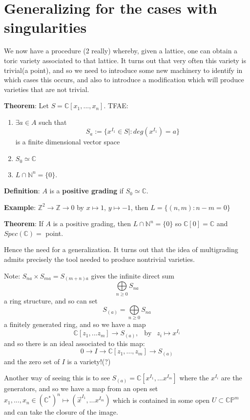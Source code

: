 \documentclass{article}
\newcommand{\C}{\mathbb{C}}
\newcommand{\CP}{\mathbb{C P}}
\newcommand{\N}{\mathbb{N}}
\newcommand{\Z}{\mathbb{Z}}
\begin{document}
	\section{Generalizing for the cases with singularities}
		We now have a procedure (2 really) whereby, given 
		a lattice, one can obtain a toric variety associated 
		to that lattice. It turns out that very often this 
		variety is trivial(a point), and so we need to 
		introduce some new machinery to identify in which 
		cases this occurs, and also to introduce a modification 
		which will produce varieties that are not trivial.


		\noindent\textbf{Theorem}: Let $S=\C[x_1,...,x_n]$. 
		TFAE:
		\begin{enumerate}
		\item $\exists a\in A$ such that 
		$$S_a:=\{x^{I_1}\in S\mid: deg(x^{I_1})=a\}$$ 
		is a finite dimensional vector space
		\item $S_0\simeq\C$
		\item $L\cap\N^n=\{0\}$. 
		\end{enumerate}

		\noindent\textbf{Definition}: $A$ is a \textbf{positive grading} 
		if $S_0\simeq\C$. 

		\noindent\textbf{Example}: $\Z^2\to\Z\to0$ by 
		$x\mapsto1$, $y\mapsto-1$, then $L=\{(n,m):n-m=0\}$ 

		\noindent\textbf{Theorem}: If $A$ is a positive grading, 
		then $L\cap\N^n=\{0\}$ so $\C[0]=\C$ 
		and $Spec(\C)=$ point.

		Hence the need for a generalization. It turns out that the idea 
		of multigrading admits precisely the tool needed to produce 
		nontrivial varieties. 

		Note: $S_{na}\times S_{ma}=S_{(m+n)a}$ gives the infinite 
		direct sum $$\bigoplus\limits_{n\ge0}S_{na}$$ a ring structure, 
		and so can set $$S_{(a)}=\bigoplus\limits_{n\ge0}S_{na}$$ 
		a finitely generated ring, and so we have a map 
		$$\C[z_1,...z_m]\to S_{(a)},~~\text{ by }~~
		z_i\mapsto x^{I_i}$$
		and so there is an ideal associated to this map: 
		$$0\to I\to\C[z_1,...,z_m]\to S_{(a)}$$
		and the zero set of $I$ is a variety!(?) 

		Another way of seeing this is to see $S_{(a)}=
		\C[x^{I_1},...x^{I_m}]$ where the $x^{I_i}$ are 
		the generators, and so we have a map from an open set 
		$x_1,...,x_n\in(\C^*)^n\mapsto(\vec{x}^{I_1},...x^{I_m})$ 
		which is contained in some open $U\subset\CP^m$ and can 
		take the closure of the image. 
\end{document}
